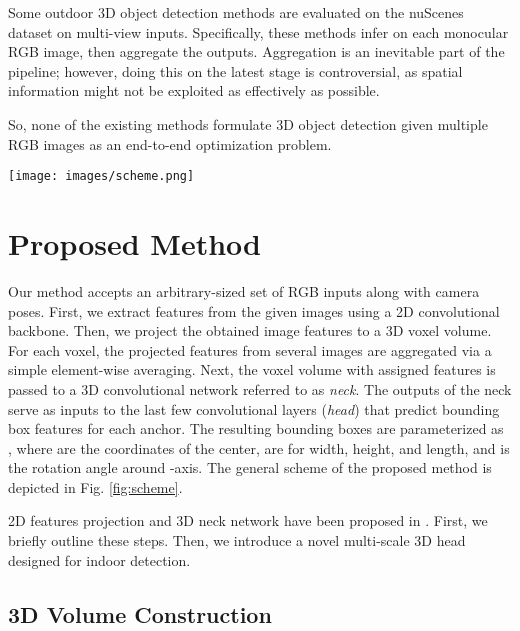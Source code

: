 \documentclass[10pt,twocolumn,letterpaper]{article}
\begin{document}
Some outdoor 3D object detection methods \cite{simonelli2020disentangling, roddick2018orthographic} are evaluated on the nuScenes \cite{caesar2020nuscenes} dataset on multi-view inputs. Specifically, these methods infer on each monocular RGB image, then aggregate the outputs. Aggregation is an inevitable part of the pipeline; however, doing this on the latest stage is controversial, as spatial information might not be exploited as effectively as possible. 

So, none of the existing methods formulate 3D object detection given multiple RGB images as an end-to-end optimization problem.

\begin{figure*}
    \centering
        \texttt{[image: images/scheme.png]}
    \caption{The general scheme of the proposed ImVoxelNet. Dashed lines around network blocks denote that network weights are shared across multiple inputs.}
    \label{fig:scheme}
\end{figure*}

\section{Proposed Method}

Our method accepts an arbitrary-sized set of RGB inputs along with camera poses. First, we extract features from the given images using a 2D convolutional backbone. Then, we project the obtained image features to a 3D voxel volume. For each voxel, the projected features from several images are aggregated via a simple element-wise averaging. Next, the voxel volume with assigned features is passed to a 3D convolutional network referred to as \textit{neck}. The outputs of the neck serve as inputs to the last few convolutional layers (\textit{head}) that predict bounding box features for each anchor. The resulting bounding boxes are parameterized as , where  are the coordinates of the center,  are for width, height, and length, and  is the rotation angle around -axis. The general scheme of the proposed method is depicted in Fig. \ref{fig:scheme}.

2D features projection and 3D neck network have been proposed in \cite{murez2020atlas, hou20193dsis}. First, we briefly outline these steps. Then, we introduce a novel multi-scale 3D head designed for indoor detection.

\subsection{3D Volume Construction}
\end{document}
